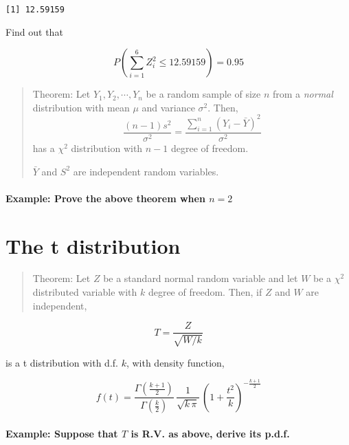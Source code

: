 \documentclass[
  letterpaper,
  DIV=11,
  numbers=noendperiod]{scrreprt}
\let\oldparagraph\paragraph
\renewcommand{\paragraph}[1]{\oldparagraph{#1}\mbox{}}
\theoremstyle{plain}
\theoremstyle{remark}
\begin{document}
\begin{verbatim}
[1] 12.59159
\end{verbatim}

Find out that

\[
P(\sum_{i=1}^6Z^2_i\leq 12.59159)=0.95
\]

\begin{quote}
Theorem: Let \(Y_1, Y_2, \cdots, Y_n\) be a random sample of size \(n\)
from a \emph{normal} distribution with mean \(\mu\) and variance
\(\sigma^2\). Then, \[
\frac{(n-1)s^2}{\sigma^2}=\frac{\sum_{i=1}^n(Y_i-\bar{Y})^2}{\sigma^2}
\] has a \(\chi^2\) distribution with \(n-1\) degree of freedom.

\(\bar{Y}\) and \(S^2\) are independent random variables.
\end{quote}

\hypertarget{example-prove-the-above-theorem-when-n2}{%
\paragraph{\texorpdfstring{Example: Prove the above theorem when
\(n=2\)}{Example: Prove the above theorem when n=2}}\label{example-prove-the-above-theorem-when-n2}}

\hypertarget{the-t-distribution}{%
\section{The t distribution}\label{the-t-distribution}}

\begin{quote}
Theorem: Let \(Z\) be a standard normal random variable and let \(W\) be
a \(\chi^2\) distributed variable with \(k\) degree of freedom. Then, if
\(Z\) and \(W\) are independent,
\end{quote}

\[
 T=\frac{Z}{\sqrt{W/k}}
\]

is a t distribution with d.f. \(k\), with density function,

\[
 f(t)=\frac{\Gamma(\frac{k+1}{2})}{\Gamma(\frac{k}{2})}\,
 \frac{1}{\sqrt{k\,\pi}}\,
 \left(1+\frac{t^2}{k}\right)^{-\frac{k+1}{2}}
\]

\hypertarget{example-suppose-that-t-is-r.v.-as-above-derive-its-p.d.f.}{%
\paragraph{\texorpdfstring{Example: Suppose that \(T\) is R.V. as above,
derive its
p.d.f.}{Example: Suppose that T is R.V. as above, derive its p.d.f.}}\label{example-suppose-that-t-is-r.v.-as-above-derive-its-p.d.f.}}
\end{document}
